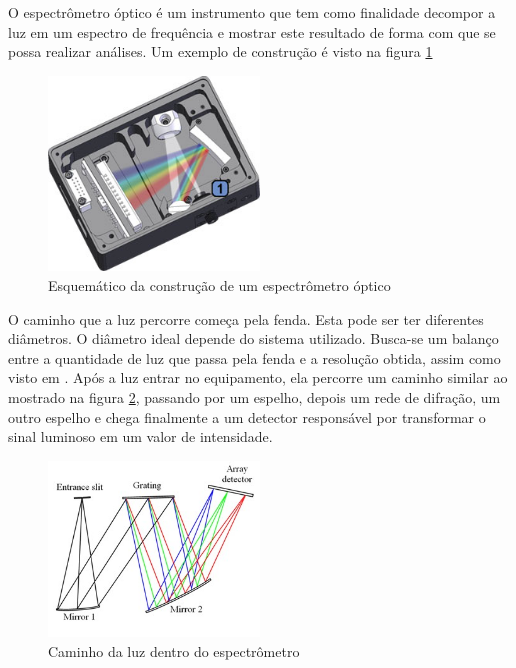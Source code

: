 \documentclass[article]{IEEEtran}
\begin{document}
O espectrômetro óptico é um instrumento que tem como finalidade decompor a luz em um espectro de frequência e mostrar este resultado de forma com que se possa realizar análises. Um exemplo de construção é visto na figura \ref{fig:espectrometro_esquematico}

\begin{figure}[H]
	\includegraphics[width=0.5\textwidth]{images/esquematico_espectrometro.jpeg}
	\caption{Esquemático da construção de um espectrômetro óptico}
	\label{fig:espectrometro_esquematico}
\end{figure} 

O caminho que a luz percorre começa pela fenda. Esta pode ser ter diferentes diâmetros. O diâmetro ideal depende do sistema utilizado. Busca-se um balanço entre a quantidade de luz que passa pela fenda e a resolução obtida, assim como visto em \cite{SPECTROMETES}. Após a luz entrar no equipamento, ela percorre um caminho similar ao mostrado na figura \ref{fig:caminho_luz}, passando por um espelho, depois um rede de difração, um outro espelho e chega finalmente a um detector responsável por transformar o sinal luminoso em um valor de intensidade.

\begin{figure}[H]
	\includegraphics[width=0.5\textwidth, height=0.35\textwidth]{images/caminho_luz.jpg}
	\caption{Caminho da luz dentro do espectrômetro}
	\label{fig:caminho_luz}
\end{figure}  
\end{document}
